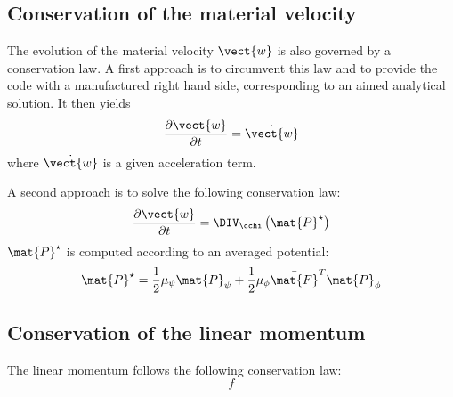 \subsection{Conservation of the material velocity}
The evolution of the material velocity $\vect{w}$ is also governed by a conservation law.
A first approach is to circumvent this law and to provide the code with a manufactured right hand side, corresponding to an aimed analytical solution. It then yields
\begin{equation}
  \frac{\partial \vect{w}}{\partial t} = \dot{\vect{w}}
\end{equation}
where $\dot{\vect{w}}$ is a given acceleration term.

A second approach is to solve the following conservation law:
\begin{equation}
	\frac{\partial \vect{w}}{\partial t} = \DIV_{\cchi} \left( \mat{P}^\star \right)
\end{equation}
%
$\mat{P}^\star$ is computed according to an averaged potential:
\begin{equation}
	\mat{P}^\star = \frac{1}{2}\mu_\psi\mat{P}_\psi +\frac{1}{2}\mu_\phi\bar{\mat{F}}^T\mat{P}_\phi
\end{equation}

\subsection{Conservation of the linear momentum}
The linear momentum follows the following conservation law:
\begin{equation}
	f
\end{equation}

